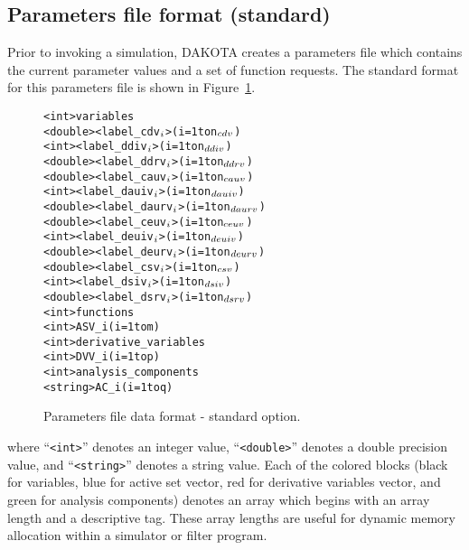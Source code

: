 \subsection{Parameters file format (standard)}\label{variables:parameters:standard}

Prior to invoking a simulation, DAKOTA creates a parameters file which
contains the current parameter values and a set of function requests.
The standard format for this parameters file is shown in
Figure~\ref{variables:figure01}.

\begin{figure}
  \centering
  \begin{bigbox}
  \begin{alltt}
    <int>    variables
    <double> <label_cdv\(\sb{i}\)>         (i = 1 to n\(\sb{cdv}\))
    <int>    <label_ddiv\(\sb{i}\)>        (i = 1 to n\(\sb{ddiv}\))
    <double> <label_ddrv\(\sb{i}\)>        (i = 1 to n\(\sb{ddrv}\))
    <double> <label_cauv\(\sb{i}\)>        (i = 1 to n\(\sb{cauv}\))
    <int>    <label_dauiv\(\sb{i}\)>       (i = 1 to n\(\sb{dauiv}\))
    <double> <label_daurv\(\sb{i}\)>       (i = 1 to n\(\sb{daurv}\))
    <double> <label_ceuv\(\sb{i}\)>        (i = 1 to n\(\sb{ceuv}\))
    <int>    <label_deuiv\(\sb{i}\)>       (i = 1 to n\(\sb{deuiv}\))
    <double> <label_deurv\(\sb{i}\)>       (i = 1 to n\(\sb{deurv}\))
    <double> <label_csv\(\sb{i}\)>         (i = 1 to n\(\sb{csv}\))
    <int>    <label_dsiv\(\sb{i}\)>        (i = 1 to n\(\sb{dsiv}\))
    <double> <label_dsrv\(\sb{i}\)>        (i = 1 to n\(\sb{dsrv}\)) \color{blue}
    <int>    functions
    <int>    ASV_i                (i = 1 to m) \color{red}
    <int>    derivative_variables
    <int>    DVV_i                (i = 1 to p) \color{green}
    <int>    analysis_components
    <string> AC_i                 (i = 1 to q)
  \end{alltt}
  \end{bigbox}
  \caption{Parameters file data format - standard option.}
  \label{variables:figure01}
\end{figure}

where ``\texttt{<int>}'' denotes an integer value,
``\texttt{<double>}'' denotes a double precision value, and
``\texttt{<string>}'' denotes a string value. Each of the colored
blocks (black for variables, blue for active set vector, red for
derivative variables vector, and green for analysis components)
denotes an array which begins with an array length and a descriptive
tag.  These array lengths are useful for dynamic memory allocation
within a simulator or filter program.


